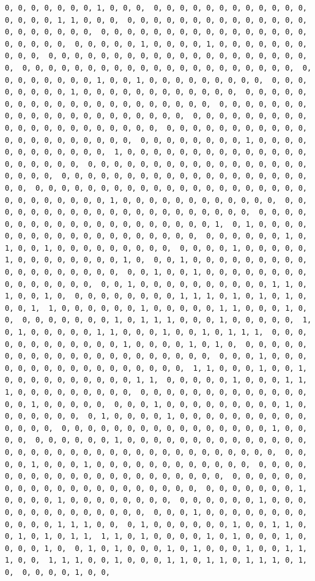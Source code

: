 \documentclass[
]{article}
\begin{document}
\begin{verbatim}
0, 0, 0, 0, 0, 0, 0, 1, 0, 0, 0,  0, 0, 0, 0, 0, 0, 0, 0, 0, 0, 0, 0, 0, 0, 0, 0, 1, 1, 0, 0, 0,  0, 0, 0, 0, 0, 0, 0, 0, 0, 0, 0, 0, 0, 0, 0, 0, 0, 0, 0, 0, 0,  0, 0, 0, 0, 0, 0, 0, 0, 0, 0, 0, 0, 0, 0, 0, 0, 0, 0, 0, 0, 0,  0, 0, 0, 0, 0, 1, 0, 0, 0, 0, 1, 0, 0, 0, 0, 0, 0, 0, 0, 0, 0,  0, 0, 0, 0, 0, 0, 0, 0, 0, 0, 0, 0, 0, 0, 0, 0, 0, 0, 0, 0, 0,  0, 0, 0, 0, 0, 0, 0, 0, 0, 0, 0, 0, 0, 0, 0, 0, 0, 0, 0, 0, 0,  0, 0, 0, 0, 0, 0, 0, 0, 1, 0, 0, 1, 0, 0, 0, 0, 0, 0, 0, 0, 0,  0, 0, 0, 0, 0, 0, 0, 0, 1, 0, 0, 0, 0, 0, 0, 0, 0, 0, 0, 0, 0,  0, 0, 0, 0, 0, 0, 0, 0, 0, 0, 0, 0, 0, 0, 0, 0, 0, 0, 0, 0, 0,  0, 0, 0, 0, 0, 0, 0, 0, 0, 0, 0, 0, 0, 0, 0, 0, 0, 0, 0, 0, 0,  0, 0, 0, 0, 0, 0, 0, 0, 0, 0, 0, 0, 0, 0, 0, 0, 0, 0, 0, 0, 0,  0, 0, 0, 0, 0, 0, 0, 0, 0, 0, 0, 0, 0, 0, 0, 0, 0, 0, 0, 0, 0,  0, 0, 0, 0, 0, 0, 0, 0, 1, 0, 0, 0, 0, 0, 0, 0, 0, 0, 0, 0, 0,  1, 0, 0, 0, 0, 0, 0, 0, 0, 0, 0, 0, 0, 0, 0, 0, 0, 0, 0, 0, 0,  0, 0, 0, 0, 0, 0, 0, 0, 0, 0, 0, 0, 0, 0, 0, 0, 0, 0, 0, 0, 0,  0, 0, 0, 0, 0, 0, 0, 0, 0, 0, 0, 0, 0, 0, 0, 0, 0, 0, 0, 0, 0,  0, 0, 0, 0, 0, 0, 0, 0, 0, 0, 0, 0, 0, 0, 0, 0, 0, 0, 0, 0, 0,  0, 0, 0, 0, 0, 0, 0, 0, 1, 0, 0, 0, 0, 0, 0, 0, 0, 0, 0, 0, 0,  0, 0, 0, 0, 0, 0, 0, 0, 0, 0, 0, 0, 0, 0, 0, 0, 0, 0, 0, 0, 0,  0, 0, 0, 0, 0, 0, 0, 0, 0, 0, 0, 0, 0, 0, 0, 0, 0, 0, 0, 0, 1,  0, 1, 0, 0, 0, 0, 0, 0, 0, 0, 0, 0, 0, 0, 0, 0, 0, 0, 0, 0, 0,  0, 0, 0, 0, 0, 0, 1, 0, 1, 0, 0, 1, 0, 0, 0, 0, 0, 0, 0, 0, 0,  0, 0, 0, 0, 1, 0, 0, 0, 0, 0, 1, 0, 0, 0, 0, 0, 0, 0, 0, 1, 0,  0, 0, 1, 0, 0, 0, 0, 0, 0, 0, 0, 0, 0, 0, 0, 0, 0, 0, 0, 0, 0,  0, 0, 1, 0, 0, 1, 0, 0, 0, 0, 0, 0, 0, 0, 0, 0, 0, 0, 0, 0, 0,  0, 0, 1, 0, 0, 0, 0, 0, 0, 0, 0, 0, 0, 1, 1, 0, 1, 0, 0, 1, 0,  0, 0, 0, 0, 0, 0, 0, 0, 1, 1, 1, 0, 1, 0, 1, 0, 1, 0, 0, 0, 1,  1, 0, 0, 0, 0, 0, 0, 1, 0, 0, 0, 0, 0, 1, 1, 0, 0, 0, 1, 0, 0,  0, 0, 0, 0, 0, 0, 0, 1, 0, 1, 1, 1, 0, 0, 0, 1, 0, 0, 0, 0, 0,  1, 0, 1, 0, 0, 0, 0, 0, 1, 1, 0, 0, 0, 1, 0, 0, 1, 0, 1, 1, 1,  0, 0, 0, 0, 0, 0, 0, 0, 0, 0, 0, 0, 1, 0, 0, 0, 0, 1, 0, 1, 0,  0, 0, 0, 0, 0, 0, 0, 0, 0, 0, 0, 0, 0, 0, 0, 0, 0, 0, 0, 0, 0,  0, 0, 0, 1, 0, 0, 0, 0, 0, 0, 0, 0, 0, 0, 0, 0, 0, 0, 0, 0, 0,  1, 1, 0, 0, 0, 1, 0, 0, 1, 0, 0, 0, 0, 0, 0, 0, 0, 0, 0, 1, 1,  0, 0, 0, 0, 0, 1, 0, 0, 0, 1, 1, 1, 0, 0, 0, 0, 0, 0, 0, 0, 0,  0, 0, 0, 0, 0, 0, 0, 0, 0, 0, 0, 0, 0, 0, 0, 1, 0, 0, 0, 0, 0,  0, 0, 0, 1, 0, 0, 0, 0, 0, 0, 0, 0, 0, 1, 0, 0, 0, 0, 0, 0, 0,  0, 1, 0, 0, 0, 0, 1, 0, 0, 0, 0, 0, 0, 0, 0, 0, 0, 0, 0, 0, 0,  0, 0, 0, 0, 0, 0, 0, 0, 0, 0, 0, 0, 0, 0, 0, 0, 1, 0, 0, 0, 0,  0, 0, 0, 0, 0, 0, 1, 0, 0, 0, 0, 0, 0, 0, 0, 0, 0, 0, 0, 0, 0,  0, 0, 0, 0, 0, 0, 0, 0, 0, 0, 0, 0, 0, 0, 0, 0, 0, 0, 0, 0, 0,  0, 0, 0, 0, 1, 0, 0, 0, 1, 0, 0, 0, 0, 0, 0, 0, 0, 0, 0, 0, 0,  0, 0, 0, 0, 0, 0, 0, 0, 0, 0, 0, 0, 0, 0, 0, 0, 0, 0, 0, 0, 0,  0, 0, 0, 0, 0, 0, 0, 0, 0, 0, 0, 0, 0, 0, 0, 0, 0, 0, 0, 0, 0,  0, 0, 0, 0, 0, 0, 0, 1, 0, 0, 0, 0, 1, 0, 0, 0, 0, 0, 0, 0, 0,  0, 0, 0, 0, 0, 0, 1, 0, 0, 0, 0, 0, 0, 0, 0, 0, 0, 0, 0, 0, 0,  0, 0, 0, 1, 0, 0, 0, 0, 0, 0, 0, 0, 0, 0, 0, 0, 1, 1, 1, 0, 0,  0, 1, 0, 0, 0, 0, 0, 0, 1, 0, 0, 1, 1, 0, 0, 1, 0, 1, 0, 1, 1,  1, 1, 0, 1, 0, 0, 0, 0, 1, 0, 1, 0, 0, 0, 1, 0, 0, 0, 0, 1, 0,  0, 1, 0, 1, 0, 0, 0, 1, 0, 1, 0, 0, 0, 1, 0, 0, 1, 1, 1, 0, 0,  1, 1, 1, 0, 0, 1, 0, 0, 0, 1, 1, 0, 1, 1, 0, 1, 1, 1, 0, 1, 0,  0, 0, 0, 0, 1, 0, 0, 
\end{verbatim}
\end{document}
